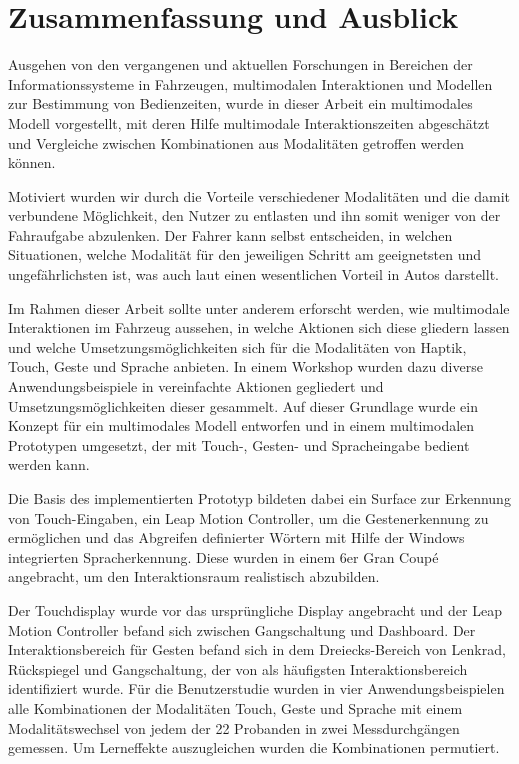 \chapter{Zusammenfassung und Ausblick}\label{cha:Zusamenfassung}
Ausgehen von den vergangenen und aktuellen Forschungen in Bereichen der Informationssysteme in Fahrzeugen, multimodalen Interaktionen und Modellen zur Bestimmung von Bedienzeiten, wurde in dieser Arbeit ein multimodales Modell vorgestellt, mit deren Hilfe multimodale Interaktionszeiten abgeschätzt und Vergleiche zwischen Kombinationen aus Modalitäten getroffen werden können.

Motiviert wurden wir durch die Vorteile verschiedener Modalitäten und die damit verbundene Möglichkeit, den Nutzer zu entlasten und ihn somit weniger von der Fahraufgabe abzulenken.
Der Fahrer kann selbst entscheiden, in welchen Situationen, welche Modalität für den jeweiligen Schritt am geeignetsten und ungefährlichsten ist, was auch laut \citet{Muller_2011} einen wesentlichen Vorteil in Autos darstellt.

Im Rahmen dieser Arbeit sollte unter anderem erforscht werden, wie multimodale Interaktionen im Fahrzeug aussehen, in welche Aktionen sich diese gliedern lassen und welche Umsetzungsmöglichkeiten sich für die Modalitäten von Haptik, Touch, Geste und Sprache anbieten.
In einem Workshop wurden dazu diverse Anwendungsbeispiele in vereinfachte Aktionen gegliedert und Umsetzungsmöglichkeiten dieser gesammelt.
Auf dieser Grundlage wurde ein Konzept für ein multimodales Modell entworfen und in einem multimodalen Prototypen umgesetzt, der mit Touch-, Gesten- und Spracheingabe bedient werden kann.

Die Basis des implementierten Prototyp bildeten dabei ein Surface zur Erkennung von Touch-Eingaben, ein Leap Motion Controller, um die  Gestenerkennung zu ermöglichen und das Abgreifen definierter Wörtern mit Hilfe der Windows integrierten Spracherkennung.  
Diese wurden in einem 6er Gran Coupé angebracht, um den Interaktionsraum realistisch abzubilden. 

Der Touchdisplay wurde vor das ursprüngliche Display angebracht und der Leap Motion Controller befand sich zwischen Gangschaltung und Dashboard. 
Der Interaktionsbereich für Gesten befand sich in dem Dreiecks-Bereich von Lenkrad, Rückspiegel und Gangschaltung, der von \citet{Riener:2013:SIG} als häufigsten Interaktionsbereich identifiziert wurde.
Für die Benutzerstudie wurden in vier Anwendungsbeispielen alle Kombinationen der Modalitäten Touch, Geste und Sprache mit einem Modalitätswechsel von jedem der 22 Probanden in zwei Messdurchgängen gemessen. 
Um Lerneffekte auszugleichen wurden die Kombinationen permutiert.

